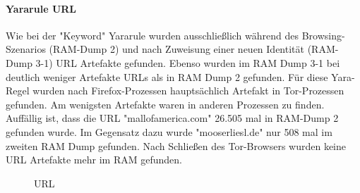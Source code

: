 \paragraph*{Yararule URL}
Wie bei der "Keyword" Yararule wurden ausschließlich während des Browsing-Szenarios (RAM-Dump 2) und nach Zuweisung einer neuen Identität (RAM-Dump 3-1) URL Artefakte gefunden. Ebenso wurden im RAM Dump 3-1 bei deutlich weniger Artefakte URLs als in RAM Dump 2 gefunden. 
Für diese Yara-Regel wurden nach Firefox-Prozessen hauptsächlich Artefakt in Tor-Prozessen gefunden. Am wenigsten Artefakte waren in anderen Prozessen zu finden.
Auffällig ist, dass die URL "mallofamerica.com" 26.505 mal in RAM-Dump 2 gefunden wurde. Im Gegensatz dazu wurde "mooserliesl.de" nur 508 mal im zweiten RAM Dump  gefunden. Nach Schließen des Tor-Browsers wurden keine URL Artefakte mehr im RAM gefunden.
\begin{figure}[h!]
	\centerline{}
	\label{chart:final-criteria}  
	\caption{URL}
\end{figure}

